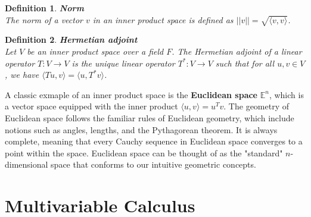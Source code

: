 \documentclass[11pt]{book} %
\newtheorem{definition}{Definition}[section]
\begin{document}
\begin{definition}{\textbf{Norm}} \\
    The norm of a vector \( v \) in an inner product space is defined as \( ||v|| = \sqrt{\langle v, v \rangle} \).
\end{definition}


\begin{definition}{\textbf{Hermetian adjoint}} \\
    Let \( V \) be an inner product space over a field \( F \). 
    The Hermetian adjoint of a linear operator \( T: V \to V \) is the unique linear operator \( T^*: V \to V \) such that for all \( u, v \in V \), we have \( \langle Tu, v \rangle = \langle u, T^*v \rangle \).
\end{definition}

A classic exmaple of an inner product space is the \textbf{Euclidean space} \( \mathbb{E}^n \), which is a vector space equipped with 
the inner product \( \langle u, v \rangle = u^T v \).
The geometry of Euclidean space follows the familiar rules of Euclidean geometry, which include notions such as angles, lengths, and the Pythagorean theorem.
It is always complete, meaning that every Cauchy sequence in Euclidean space converges to a point within the space.
Euclidean space can be thought of as the "standard" \( n \)-dimensional space that conforms to our intuitive geometric concepts.




\chapter{Multivariable Calculus}
\end{document}
